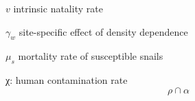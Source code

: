 \documentclass[12pt]{article}
\begin{document}
$v$ intrinsic natality rate

$\gamma_w$ site-specific effect of density dependence

$\mu_s$ mortality rate of susceptible snails







χ: human contamination rate
\begin{equation}
\rho \cap \alpha
\end{equation}

 
\end{document}
